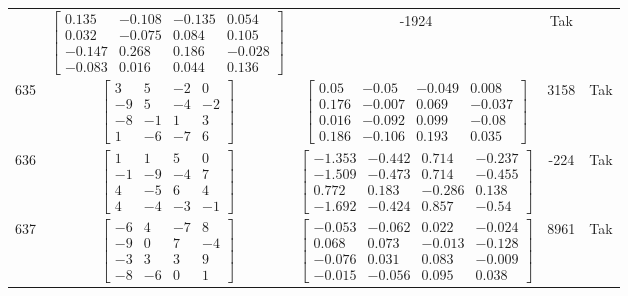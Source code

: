 \documentclass[a4paper,12pt]{article}
\begin{document}
\begin{tabular}{c c c c c}
&
$\begin{bmatrix} 0.135 & -0.108 & -0.135 & 0.054 \\ 0.032 & -0.075 & 0.084 & 0.105 \\ -0.147 & 0.268 & 0.186 & -0.028 \\ -0.083 & 0.016 & 0.044 & 0.136 \end{bmatrix}$
&
-1924
&
Tak
\\
635
&
$\begin{bmatrix} 3 & 5 & -2 & 0 \\ -9 & 5 & -4 & -2 \\ -8 & -1 & 1 & 3 \\ 1 & -6 & -7 & 6 \end{bmatrix}$
&
$\begin{bmatrix} 0.05 & -0.05 & -0.049 & 0.008 \\ 0.176 & -0.007 & 0.069 & -0.037 \\ 0.016 & -0.092 & 0.099 & -0.08 \\ 0.186 & -0.106 & 0.193 & 0.035 \end{bmatrix}$
&
3158
&
Tak
\\
636
&
$\begin{bmatrix} 1 & 1 & 5 & 0 \\ -1 & -9 & -4 & 7 \\ 4 & -5 & 6 & 4 \\ 4 & -4 & -3 & -1 \end{bmatrix}$
&
$\begin{bmatrix} -1.353 & -0.442 & 0.714 & -0.237 \\ -1.509 & -0.473 & 0.714 & -0.455 \\ 0.772 & 0.183 & -0.286 & 0.138 \\ -1.692 & -0.424 & 0.857 & -0.54 \end{bmatrix}$
&
-224
&
Tak
\\
637
&
$\begin{bmatrix} -6 & 4 & -7 & 8 \\ -9 & 0 & 7 & -4 \\ -3 & 3 & 3 & 9 \\ -8 & -6 & 0 & 1 \end{bmatrix}$
&
$\begin{bmatrix} -0.053 & -0.062 & 0.022 & -0.024 \\ 0.068 & 0.073 & -0.013 & -0.128 \\ -0.076 & 0.031 & 0.083 & -0.009 \\ -0.015 & -0.056 & 0.095 & 0.038 \end{bmatrix}$
&
8961
&
Tak
\\

\end{tabular}
\end{document}

